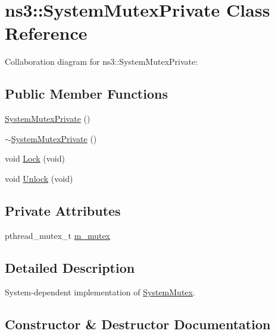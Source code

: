 \hypertarget{classns3_1_1SystemMutexPrivate}{}\section{ns3\+:\+:System\+Mutex\+Private Class Reference}
\label{classns3_1_1SystemMutexPrivate}


Collaboration diagram for ns3\+:\+:System\+Mutex\+Private\+:
\subsection*{Public Member Functions}
\begin{DoxyCompactItemize}
\item 
\hyperlink{classns3_1_1SystemMutexPrivate_a81f2bbb935ece47c9e86fc7742984a0f}{System\+Mutex\+Private} ()
\item 
\hyperlink{classns3_1_1SystemMutexPrivate_ad926e50e7892f6bafd609110c7bec08f}{$\sim$\+System\+Mutex\+Private} ()
\item 
void \hyperlink{classns3_1_1SystemMutexPrivate_a683dab8c78c48119cfab8168296f4942}{Lock} (void)
\item 
void \hyperlink{classns3_1_1SystemMutexPrivate_a1c3cca1467f9fbd050d044cd85fa9716}{Unlock} (void)
\end{DoxyCompactItemize}
\subsection*{Private Attributes}
\begin{DoxyCompactItemize}
\item 
pthread\+\_\+mutex\+\_\+t \hyperlink{classns3_1_1SystemMutexPrivate_a254d1aeb046eb02f444802e2ba97644a}{m\+\_\+mutex}
\end{DoxyCompactItemize}


\subsection{Detailed Description}
System-\/dependent implementation of \hyperlink{classns3_1_1SystemMutex}{System\+Mutex}. 

\subsection{Constructor \& Destructor Documentation}
